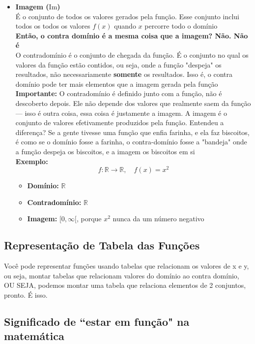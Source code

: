 \documentclass{article}
\begin{document}
\begin{itemize}
    \item \textbf{Imagem ($\mathrm{Im}$)}
    \\[5pt]
    É o conjunto de todos os valores gerados pela função. Esse conjunto inclui todos os todos os valores $f(x)$ quando $x$ percorre todo o domínio
    \\[5pt]
    \textbf{Então, o contra domínio é a mesma coisa que a imagem? Não. Não é}
    \\[5pt]
    O contradomínio é o conjunto de chegada da função. É o conjunto no qual os valores da função estão contidos, ou seja, onde a função "despeja" os resultados, não necessariamente \textbf{somente} os resultados. Isso é, o contra domínio pode ter mais elementos que a imagem gerada pela função \textbf{Importante:} O contradomínio é definido junto com a função, não é descoberto depois. Ele não depende dos valores que realmente saem da função — isso é outra coisa, essa coisa é justamente a imagem. A imagem é o conjunto de valores efetivamente produzidos pela função. Entendeu a diferença? Se a gente tivesse uma função que enfia farinha, e ela faz biscoitos, é como se o domínio fosse a farinha, o contra-domínio fosse a "bandeja" onde a função despeja os biscoitos, e a imagem os biscoitos em si
    \\[5pt]
    \textbf{Exemplo:}
    \[
    f: \mathbb{R} \to \mathbb{R}, \quad f(x) = x^2
    \]
    \begin{itemize}
        \item \textbf{Domínio:} $\mathbb{R}$
        \item \textbf{Contradomínio:} $\mathbb{R}$
        \item \textbf{Imagem:} $[0, \infty[$, porque $x^2$ nunca da um número negativo
    \end{itemize}
    \end{itemize}

\subsection{Representação de Tabela das Funções}
Você pode representar funções usando tabelas que relacionam os valores de x e y, ou seja, montar tabelas que relacionam valores do domínio ao contra domínio, OU SEJA, podemos montar uma tabela que relaciona elementos de 2 conjuntos, pronto. É isso.

\subsection{Significado de ``estar em função" na matemática}
\end{document}

